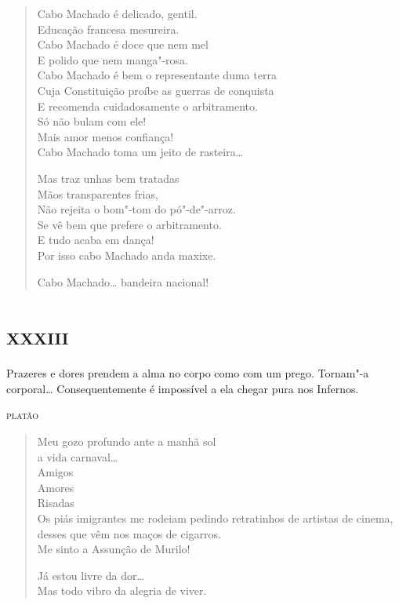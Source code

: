 {\begin{verse}
Cabo Machado é delicado, gentil.\\
Educação francesa mesureira.\\
Cabo Machado é doce que nem mel\\
E polido que nem manga"-rosa.\\
Cabo Machado é bem o representante duma terra\\
Cuja Constituição proíbe as guerras de conquista\\
E recomenda cuidadosamente o arbitramento.\\
Só não bulam com ele!\\
Mais amor menos confiança!\\
Cabo Machado toma um jeito de rasteira\ldots{}

Mas traz unhas bem tratadas\\
Mãos transparentes frias,\\
Não rejeita o bom"-tom do pó"-de"-arroz.\\
Se vê bem que prefere o arbitramento.\\
E tudo acaba em dança!\\
Por isso cabo Machado anda maxixe.

Cabo Machado\ldots{} bandeira nacional!
\end{verse}

\chapter[«Meu gozo profundo ante a manhã sol»]{\textsc{xxxiii}}

\epigraph{Prazeres e dores prendem a alma no corpo como com um prego. Tornam"-a
corporal\ldots{} Consequentemente é impossível a ela chegar pura nos
Infernos.}{\textsc{platão}}

\begin{verse}
Meu gozo profundo ante a manhã sol\\
\qquad\qquad\qquad\qquad{}a vida carnaval\ldots{}\\
\qquad\qquad\qquad\qquad{}Amigos\\
\qquad\qquad\qquad{}Amores\\
\qquad\qquad{}Risadas\\
Os piás imigrantes me rodeiam pedindo retratinhos de artistas de cinema, desses que vêm nos maços de cigarros.\\
Me sinto a Assunção de Murilo!

Já estou livre da dor\ldots{}\\
Mas todo vibro da alegria de viver.


\end{verse}}
